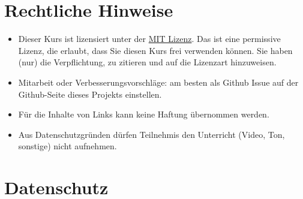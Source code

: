 \documentclass[
  a4paper,
  DIV=11]{scrreprt}
\providecommand{\tightlist}{%
  \setlength{\itemsep}{0pt}\setlength{\parskip}{0pt}}\usepackage{longtable,booktabs,array}
\theoremstyle{definition}
\theoremstyle{definition}
\theoremstyle{remark}
\begin{document}
\hypertarget{rechtliche-hinweise}{%
\section*{Rechtliche Hinweise}\label{rechtliche-hinweise}}


\begin{itemize}
\tightlist
\item
  Dieser Kurs ist lizensiert unter der
  \href{https://github.com/sebastiansauer/bayes-start/blob/main/LICENSE}{MIT
  Lizenz}. Das ist eine permissive Lizenz, die erlaubt, dass Sie diesen
  Kurs frei verwenden können. Sie haben (nur) die Verpflichtung, zu
  zitieren und auf die Lizenzart hinzuweisen.
\item
  Mitarbeit oder Verbesserungsvorschläge: am besten als Github Issue auf
  der Github-Seite dieses Projekts einstellen.
\item
  Für die Inhalte von Links kann keine Haftung übernommen werden.
\item
  Aus Datenschutzgründen dürfen Teilnehmis den Unterricht (Video, Ton,
  sonstige) nicht aufnehmen.
\end{itemize}

\hypertarget{datenschutz}{%
\section*{Datenschutz}\label{datenschutz}}

\end{document}
